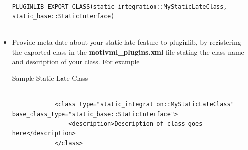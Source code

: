 \documentclass{article}
\newenvironment{longlisting}{\captionsetup{type=listing}}{}
\begin{document}
\begin{itemize}
\begin{longlisting}
\begin{verbatim}
			PLUGINLIB_EXPORT_CLASS(static_integration::MyStaticLateClass, static_base::StaticInterface)
			
		\end{verbatim}
		\label{pluginexport}
	\end{longlisting}
	
	\item Provide meta-date about your static late feature to pluginlib, by registering the exported class in the  \textbf{motivml\_plugins.xml} file stating the class name and description of your class. For example
	
	\begin{longlisting}
		\caption{Sample Static Late Class}
		\begin{verbatim}
			
			<class type="static_integration::MyStaticLateClass" base_class_type="static_base::StaticInterface">
				<description>Description of class goes here</description>
			</class>
			
		\end{verbatim}
		\label{samplestaticlatedesc}
	\end{longlisting}
	
\end{itemize}
\end{document}
